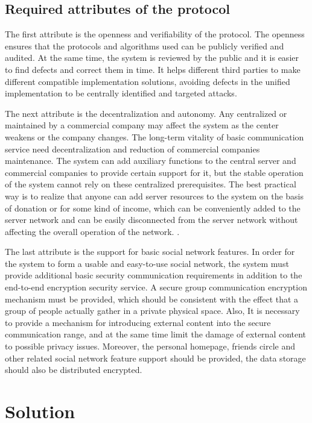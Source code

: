 \documentclass[11pt,en]{elegantpaper}
\begin{document}
\subsection{Required attributes of the protocol}
The first attribute is the openness and verifiability of the protocol. The openness ensures that the protocols and algorithms used can be publicly verified and audited. At the same time, the system is reviewed by the public and it is easier to find defects and correct them in time. It helps different third parties to make different compatible implementation solutions, avoiding defects in the unified implementation to be centrally identified and targeted attacks.

The next attribute is the decentralization and autonomy. Any centralized or maintained by a commercial company may affect the system as the center weakens or the company changes. The long-term vitality of basic communication service need decentralization and reduction of commercial companies maintenance. The system can add auxiliary functions to the central server and commercial companies to provide certain support for it, but the stable operation of the system cannot rely on these centralized prerequisites. The best practical way is to realize that anyone can add server resources to the system on the basis of donation or for some kind of income, which can be conveniently added to the server network and can be easily disconnected from the server network without affecting the overall operation of the network. .

The last attribute is the support for basic social network features. In order for the system to form a usable and easy-to-use social network, the system must provide additional basic security communication requirements in addition to the end-to-end encryption security service. A secure group communication encryption mechanism must be provided, which should be consistent with the effect that a group of people actually gather in a private physical space. Also, It is necessary to provide a mechanism for introducing external content into the secure communication range, and at the same time limit the damage of external content to possible privacy issues. Moreover, the personal homepage, friends circle and other related social network feature support should be provided, the data storage should also be distributed encrypted.


\section{Solution}
\end{document}
